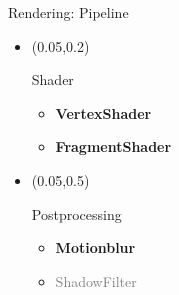 \documentclass[10pt]{beamer}
\begin{document}
\begin{frame}[fragile]{Rendering: Pipeline}
    \setlength{\TPHorizModule}{\textwidth}
    \setlength{\TPVertModule}{\textwidth}
    \begin{itemize}
    \item \begin{textblock}{0.5}(0.05,0.2)
            \begin{block}{Shader}
                \begin{itemize}
                    \item \textbf{VertexShader}
                    \item \textbf{FragmentShader}
                \end{itemize}
            \end{block}
        \end{textblock}
    \item \begin{textblock}{0.5}(0.05,0.5)
            \begin{block}{Postprocessing}
                \begin{itemize}
                    \item \textbf{Motionblur}
                    \item \textcolor{gray}{ShadowFilter}
                \end{itemize}
            \end{block}
        \end{textblock}
    \end{itemize}
\end{frame}
\end{document}
